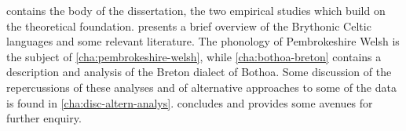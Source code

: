  contains the body of the dissertation, \ie the two empirical studies which build on the theoretical foundation.  presents a brief overview of the Brythonic Celtic languages and some relevant literature. The phonology of Pembrokeshire Welsh is the subject of \cref{cha:pembrokeshire-welsh}, while \cref{cha:bothoa-breton} contains a description and analysis of the Breton dialect of Bothoa. Some discussion of the repercussions of these analyses and of alternative approaches to some of the data is found in \cref{cha:disc-altern-analys}.  concludes and provides some avenues for further enquiry.